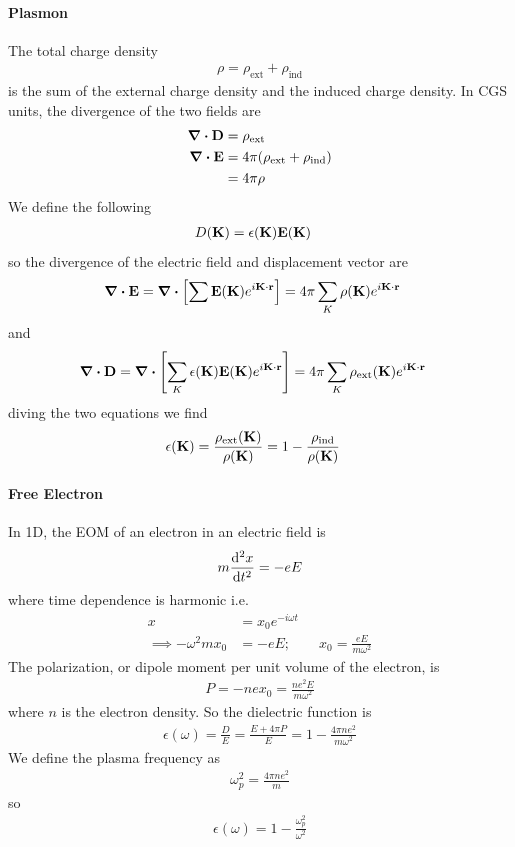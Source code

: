 \documentclass[../main.tex]{subfiles}
\begin{document}
\paragraph*{Plasmon} 
The total charge density
\begin{align*}
    \rho = \rho_{\text{ext}} + \rho_{\text{ind}}
\end{align*}
is the sum of the external charge density and the induced charge density. In CGS units, the 
divergence of the two fields are
\begin{align*}
    \div \vb D &= \rho_{\text{ext}} \\
    \div \vb E &= 4\pi(\rho_{\text{ext}} + \rho_{\text{ind}})\\
        &= 4\pi \rho
\end{align*}
We define the following
\begin{align*}
    D(\vb K) &= \epsilon(\vb K) \vb E(\vb K)
\end{align*}
so the divergence of the electric field and displacement vector are
\begin{align*}
    \div \vb E &= \div [\sum \vb E(\vb K) e^{i\vb K \cdot \vb r}] 
    = 4\pi \sum_K \rho(\vb K) e^{i\vb K \cdot \vb r} 
\end{align*}
and
\begin{align*}
    \div \vb D &= \div[\sum_K \epsilon(\vb K) \vb E(\vb K) e^{i\vb K \cdot \vb r}]
    = 4\pi \sum_K \rho_{\text{ext}}(\vb K) e^{i\vb K \cdot \vb r}
\end{align*}
diving the two equations we find
\begin{align*}
    \epsilon(\vb K) &= \frac{\rho_{\text{ext}}(\vb K)}{\rho(\vb K)}
     = 1 - \frac{\rho_{\text{ind}}}{\rho(\vb K)}
\end{align*}
\paragraph*{Free Electron} In 1D, the EOM of an electron in an electric field is
\begin{align*}
    m \dv[2]{x}{t} = - eE
\end{align*}
where time dependence is harmonic i.e.
\begin{align*}
    x &= x_0 e^{-i\omega t} \\
    \implies -\omega^2 m x_0 &= -eE;\qquad x_0 = \frac{eE}{m\omega^2}
\end{align*}
The polarization, or dipole moment per unit volume of the electron, is
\begin{align*}
    P = -nex_0 = \frac{ne^2E}{m\omega^2}
\end{align*}
where $n$ is the electron density. So the dielectric function is
\begin{align*}
    \epsilon(\omega) = \frac{D}{E} = \frac{E + 4\pi P}{E} = 1 - \frac{4\pi ne^2}{m\omega^2}
\end{align*}
We define the plasma frequency as
\begin{align*}
    \omega_p^2 = \frac{4\pi ne^2}{m} 
\end{align*}
so
\begin{align*}
    \epsilon(\omega) = 1 - \frac{\omega_p^2}{\omega^2}
\end{align*}
\end{document}
